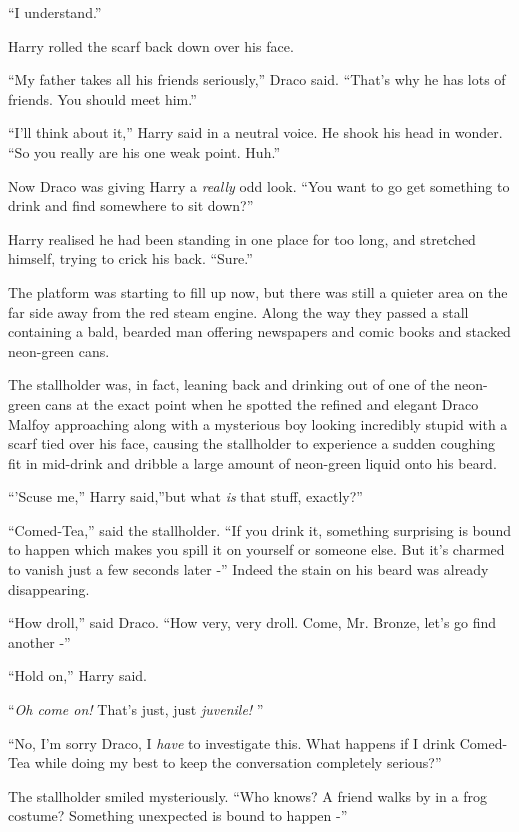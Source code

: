 ``I understand.''

Harry rolled the scarf back down over his face.

``My father takes all his friends seriously,'' Draco said. ``That's why
he has lots of friends. You should meet him.''

``I'll think about it,'' Harry said in a neutral voice. He shook his
head in wonder. ``So you really are his one weak point. Huh.''

Now Draco was giving Harry a \emph{really} odd look. ``You want to go
get something to drink and find somewhere to sit down?''

Harry realised he had been standing in one place for too long, and
stretched himself, trying to crick his back. ``Sure.''

The platform was starting to fill up now, but there was still a quieter
area on the far side away from the red steam engine. Along the way they
passed a stall containing a bald, bearded man offering newspapers and
comic books and stacked neon-green cans.

The stallholder was, in fact, leaning back and drinking out of one of
the neon-green cans at the exact point when he spotted the refined and
elegant Draco Malfoy approaching along with a mysterious boy looking
incredibly stupid with a scarf tied over his face, causing the
stallholder to experience a sudden coughing fit in mid-drink and dribble
a large amount of neon-green liquid onto his beard.

``'Scuse me,'' Harry said,''but what \emph{is} that stuff, exactly?''

``Comed-Tea,'' said the stallholder. ``If you drink it, something
surprising is bound to happen which makes you spill it on yourself or
someone else. But it's charmed to vanish just a few seconds later -''
Indeed the stain on his beard was already disappearing.

``How droll,'' said Draco. ``How very, very droll. Come, Mr. Bronze,
let's go find another -''

``Hold on,'' Harry said.

``\emph{Oh come on!} That's just, just \emph{juvenile!} ''

``No, I'm sorry Draco, I \emph{have} to investigate this. What happens if
I drink Comed-Tea while doing my best to keep the conversation
completely serious?''

The stallholder smiled mysteriously. ``Who knows? A friend walks by in a
frog costume? Something unexpected is bound to happen -''

